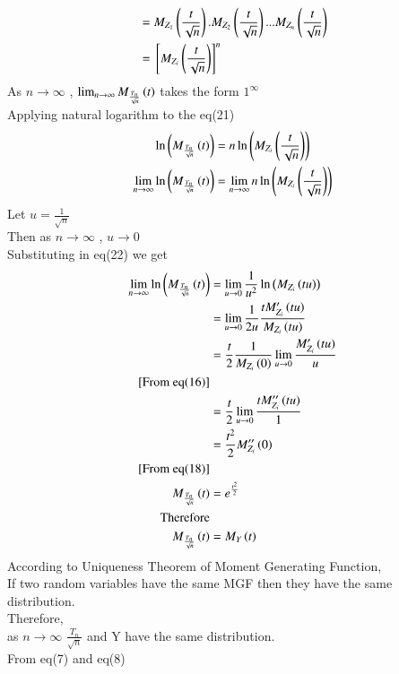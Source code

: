 \documentclass[journal,12pt,twocolumn]{IEEEtran}
\begin{document}
\begin{enumerate}[label=(\Roman*), align=left]
\begin{align}
    &=M_{Z_1}\left(\frac{t}{\sqrt{n}}\right).M_{Z_2}\left(\frac{t}{\sqrt{n}}\right)...M_{Z_n}\left(\frac{t}{\sqrt{n}}\right)\nonumber\\
    &={}\left[M_{Z_i}\left(\frac{t}{\sqrt{n}}\right)\right]^n
    \end{align}
As $n \to \infty $ , $\lim_{n \to \infty} M_{\frac{T_n}{\sqrt{n}}}\left(t\right)$ takes the form $1^\infty$
\\Applying natural logarithm to the eq(21)
 \begin{align}
    \ln\left(M_{\frac{T_n}{\sqrt{n}}}\left(t\right)\right)&=n\ln\left(M_{Z_i}\left(\frac{t}{\sqrt{n}}\right)\right)\nonumber\\
    \lim_{n \to \infty}\ln\left(M_{\frac{T_n}{\sqrt{n}}}\left(t\right)\right)&=\lim_{n \to \infty}n\ln\left(M_{Z_i}\left(\frac{t}{\sqrt{n}}\right)\right)
    \end{align}
Let $u=\frac{1}{\sqrt{n}}$
\\Then as $n \to \infty $ , $u \to 0 $ 
\\Substituting in eq(22) we get
\begin{align}
    \lim_{n \to \infty}\ln\left(M_{\frac{T_n}{\sqrt{n}}}\left(t\right)\right)&=\lim_{u \to 0}\frac{1}{u^2}\ln\left(M_{Z_i}\left(tu\right)\right)\nonumber\\
    &=\lim_{u \to 0}\frac{1}{2u}\frac{tM_{Z_i}'\left(tu\right)}{M_{Z_i}\left(tu\right)}\nonumber\\
    &=\frac{t}{2}\frac{1}{M_{Z_i}\left(0\right)}\lim_{u \to 0}\frac{M_{Z_i}'\left(tu\right)}{u}\nonumber\\
    \text{[From eq(16)]}\nonumber\\
    &=\frac{t}{2}\lim_{u \to 0}\frac{tM_{Z_i}''\left(tu\right)}{1} \nonumber\\
    &=\frac{t^2}{2}M_{Z_i}''\left(0\right)\nonumber\\
    \text{[From eq(18)]}\nonumber\\
    M_{\frac{T_n}{\sqrt{n}}}\left(t\right)&=e^{\frac{t^2}{2}} \\
    \text{Therefore}\nonumber\\
    M_{\frac{T_n}{\sqrt{n}}}\left(t\right)&=M_Y\left(t\right)
    \end{align}
According to Uniqueness Theorem of Moment Generating Function,
\\If two random variables have the same MGF then they have the same distribution.
\\Therefore,
\\as $n \to \infty$ $\frac{T_n}{\sqrt{n}}$ and Y have the same distribution.
\\From eq(7) and eq(8)
 \begin{align}

\end{align}
\end{enumerate}
\end{document}
